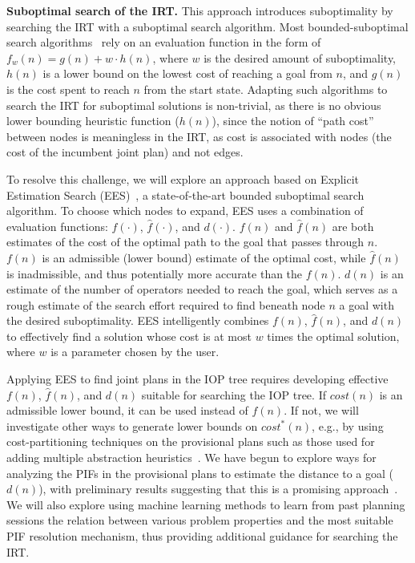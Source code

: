 \documentclass[11pt]{article}
\begin{document}
{\bf Suboptimal search of the IRT.} 
This approach introduces suboptimality by searching the IRT with a suboptimal search algorithm. Most bounded-suboptimal search algorithms~\cite{pohl1973avoidance,pearl1982studies,thayer2011bounded} rely on an evaluation function in the form of $f_w(n)=g(n)+w\cdot h(n)$, where $w$ is the desired amount of suboptimality, $h(n)$ is a lower bound on the lowest cost of reaching a goal from $n$, and $g(n)$ is the cost spent to reach $n$ from the start state. Adapting such algorithms to search the IRT for suboptimal solutions is non-trivial, as there is no obvious lower bounding heuristic function ($h(n)$), since the notion of ``path cost'' between nodes is meaningless in the IRT, as cost is associated with nodes (the cost of the incumbent joint plan) and not edges. 

To resolve this challenge, we will explore an approach based on Explicit Estimation Search (EES)~\cite{thayer2011bounded}, a state-of-the-art bounded suboptimal search algorithm. To choose which nodes to expand, EES uses a combination of evaluation functions: $f(\cdot)$, $\hat{f}(\cdot)$, and $d(\cdot)$. $f(n)$ and $\hat{f}(n)$ are both estimates of the cost of the optimal path to the goal that passes through $n$. $f(n)$ is an admissible (lower bound) estimate of the optimal cost, while $\hat{f}(n)$ is inadmissible, and thus potentially more accurate than the $f(n)$. $d(n)$ is an estimate of the number of operators needed to reach the goal, which serves as a rough estimate of the search effort required to find  beneath node $n$ a goal with the desired suboptimality. EES intelligently combines $f(n)$, $\hat{f}(n)$, and $d(n)$ to effectively find a solution whose cost is at most $w$ times the optimal solution, where $w$ is a parameter chosen by the user.


Applying EES to find joint plans in the IOP tree requires developing effective $f(n)$, $\hat{f}(n)$, and $d(n)$ suitable for searching the IOP tree. If $cost(n)$ is an admissible lower bound, it can be used instead of $f(n)$. If not, we will investigate other ways to generate lower bounds on $cost^*(n)$, e.g., by using cost-partitioning techniques on the provisional plans such as those used for adding multiple abstraction heuristics~\cite{katz2010optimal}. We have begun to explore ways for analyzing the PIFs in the provisional plans to estimate the distance to a goal ($d(n)$), with preliminary results suggesting that this is a promising approach~\cite{barer2014suboptimal-socs}. We will also explore using machine learning methods to learn from past planning sessions the relation between various problem properties and the most suitable PIF resolution mechanism, thus providing additional guidance for searching the IRT. 
\end{document}
